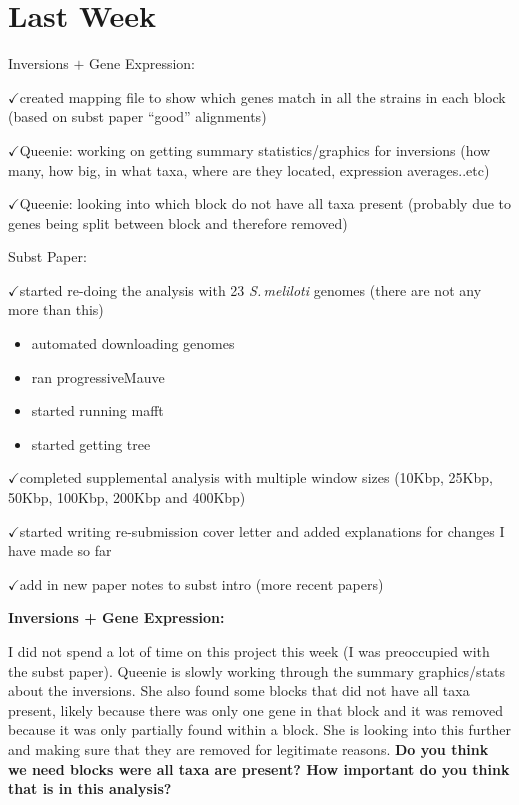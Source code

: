 \documentclass[12pt]{article}
\newcommand{\smel}{\textit{S.\,meliloti}\xspace}
\newcommand{\p}{progressiveMauve\xspace}
\newcommand{\ch}{$\checkmark$}
\begin{document}

	
\section*{Last Week}


Inversions $+$ Gene Expression:

\ch created mapping file to show which genes match in all the strains in each block (based on subst paper ``good'' alignments)

\ch Queenie: working on getting summary statistics/graphics for inversions (how many, how big, in what taxa, where are they located, expression averages..etc)

\ch Queenie: looking into which block do not have all taxa present (probably due to genes being split between block and therefore removed)

Subst Paper:

\ch started re-doing the analysis with 23 \smel genomes (there are not any more than this)
\begin{itemize}
	\item automated downloading genomes
	\item ran \p
	\item  started running mafft
	\item started getting tree
\end{itemize}

\ch completed supplemental analysis with multiple window sizes (10Kbp, 25Kbp, 50Kbp, 100Kbp, 200Kbp and 400Kbp)

\ch started writing re-submission cover letter and added explanations for changes I have made so far


\ch add in new paper notes to subst intro (more recent papers)





\textbf{Inversions + Gene Expression:}

I did not spend a lot of time on this project this week (I was preoccupied with the subst paper).
Queenie is slowly working through the summary graphics/stats about the inversions.
She also found some blocks that did not have all taxa present, likely because there was only one gene in that block and it was removed because it was only partially found within a block.
She is looking into this further and making sure that they are removed for legitimate reasons.
\textbf{Do you think we need blocks were all taxa are present? How important do you think that is in this analysis?}
\end{document}
